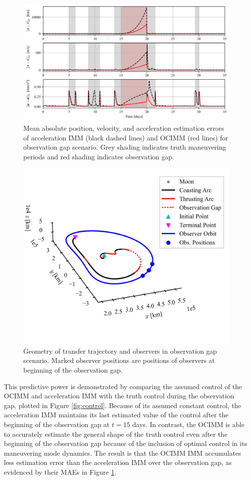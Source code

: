\documentclass[letterpaper, preprint, paper,11pt]{AAS}	%
\begin{document}
\begin{figure}
    \centering
    \includegraphics[width=1\linewidth]{Figures/MAE_gap.png}
    \caption{Mean absolute position, velocity, and acceleration estimation errors of acceleration IMM (black dashed lines) and OCIMM (red lines) for observation gap scenario. Grey shading indicates truth maneuvering periods and red shading indicates observation gap.}
    \label{fig:MAE-gap}
\end{figure}

\begin{figure}
    \centering
    \includegraphics[width=0.5\linewidth]{Figures/unobserved_trajectory.png}
    \caption{Geometry of transfer trajectory and observers in observation gap scenario. Marked observer positions are positions of observers at beginning of the observation gap.}
    \label{fig:unobserved_trajectory}
\end{figure}

This predictive power is demonstrated by comparing the assumed control of the OCIMM and acceleration IMM with the truth control during the observation gap, plotted in Figure \ref{fig:control}. Because of its assumed constant control, the acceleration IMM maintains its last estimated value of the control after the beginning of the observation gap at $t=15$ days. In contrast, the OCIMM is able to accurately estimate the general shape of the truth control even after the beginning of the observation gap because of the inclusion of optimal control in its maneuvering mode dynamics. The result is that the OCIMM IMM accumulates less estimation error than the acceleration IMM over the observation gap, as evidenced by their MAEs in Figure \ref{fig:MAE-gap}. 
\end{document}
